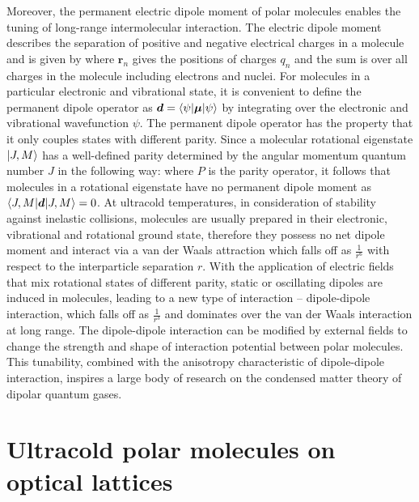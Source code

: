 Moreover, the permanent electric dipole moment of polar molecules enables the tuning of long-range intermolecular 
interaction. The electric dipole moment describes the separation of positive and negative electrical charges
in a molecule and is given by
where $\mathbf{r}_{n}$ gives the positions of charges $q_n$ and the sum is over all charges in the molecule including 
electrons and nuclei. For molecules in a particular electronic and vibrational state, it is convenient to define the permanent
dipole operator as $\boldsymbol{d} = \langle \psi | \boldsymbol{\mu} | \psi \rangle$ by integrating over the electronic and
vibrational wavefunction $\psi$. The permanent dipole operator has the property that it only couples states with different
parity. Since a molecular rotational eigenstate $| J, M \rangle$  has a well-defined parity 
determined by the angular momentum quantum number $J$ in the following way:
where $P$ is the parity operator, it follows that molecules in a rotational eigenstate have no permanent dipole moment as $\langle J, M | \boldsymbol{d} | J, M \rangle = 0$. At ultracold temperatures, in consideration of stability against inelastic collisions, 
molecules are usually prepared in their electronic, vibrational and rotational ground state, therefore they possess no net
dipole moment and interact via a van der Waals attraction which falls off as $\frac{1 }{r^6}$ with respect to the
interparticle separation $r$. With the application of electric fields that mix rotational states of different parity, static or 
oscillating dipoles are induced in molecules, leading to a new type of interaction -- dipole-dipole interaction, which falls off
as $\frac{1}{r^3}$ and dominates over the van der Waals interaction at long range. The dipole-dipole interaction can be
modified by external fields to change the strength and shape of interaction potential between 
polar molecules\cite{micheli2007, buchler2007a}. This tunability, combined with the anisotropy characteristic of 
dipole-dipole interaction, inspires a large body of research on the condensed matter theory of dipolar quantum 
gases\cite{baranov2008, lahaye2009, trefzger2011, Baranov2012}. 




\section{Ultracold polar molecules on optical lattices}
\label{sec:opticalLattice}

